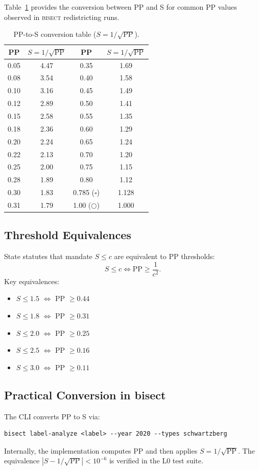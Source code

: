 Table~\ref{tab:conversion} provides the conversion between PP and S for
common PP values observed in \textsc{bisect} redistricting runs.

\begin{table}[ht]
\centering
\caption{PP-to-S conversion table ($S = 1/\sqrt{\text{PP}}$).}
\label{tab:conversion}
\begin{tabular}{cc|cc}
\toprule
PP & $S = 1/\sqrt{\text{PP}}$ & PP & $S = 1/\sqrt{\text{PP}}$ \\
\midrule
0.05 & 4.47 & 0.35 & 1.69 \\
0.08 & 3.54 & 0.40 & 1.58 \\
0.10 & 3.16 & 0.45 & 1.49 \\
0.12 & 2.89 & 0.50 & 1.41 \\
0.15 & 2.58 & 0.55 & 1.35 \\
0.18 & 2.36 & 0.60 & 1.29 \\
0.20 & 2.24 & 0.65 & 1.24 \\
0.22 & 2.13 & 0.70 & 1.20 \\
0.25 & 2.00 & 0.75 & 1.15 \\
0.28 & 1.89 & 0.80 & 1.12 \\
0.30 & 1.83 & 0.785 ($\square$) & 1.128 \\
0.31 & 1.79 & 1.00 ($\bigcirc$) & 1.000 \\
\bottomrule
\end{tabular}
\end{table}

\subsection{Threshold Equivalences}

State statutes that mandate $S \leq c$ are equivalent to PP thresholds:
\[
  S \leq c \iff \text{PP} \geq \frac{1}{c^2}.
\]
Key equivalences:
\begin{itemize}
  \item $S \leq 1.5$ $\Leftrightarrow$ PP $\geq 0.44$
  \item $S \leq 1.8$ $\Leftrightarrow$ PP $\geq 0.31$
  \item $S \leq 2.0$ $\Leftrightarrow$ PP $\geq 0.25$
  \item $S \leq 2.5$ $\Leftrightarrow$ PP $\geq 0.16$
  \item $S \leq 3.0$ $\Leftrightarrow$ PP $\geq 0.11$
\end{itemize}

\subsection{Practical Conversion in bisect}

The CLI converts PP to S via:
\begin{verbatim}
bisect label-analyze <label> --year 2020 --types schwartzberg
\end{verbatim}
Internally, the implementation computes PP and then applies $S = 1/\sqrt{\text{PP}}$.
The equivalence $|S - 1/\sqrt{\text{PP}}| < 10^{-6}$ is verified in the L0 test suite.

